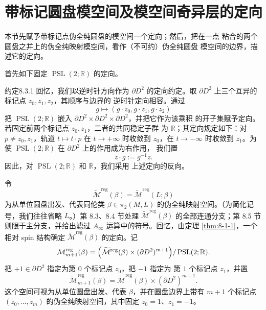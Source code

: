 
\section{带标记圆盘模空间及模空间奇异层的定向}
\label{sec:8-3}

本节先赋予带标记点伪全纯圆盘的模空间一个定向；然后，把在一点
粘合的两个圆盘之并上的伪全纯映射模空间，看作（不可约）伪全纯圆盘
模空间的边界，描述它的定向。

首先如下固定 $\operatorname{PSL}(2;\mathbb R)$ 的定向。

\begin{statement}{约定}{8.3.1}\label{conv:8-3-1}
回忆，我们以逆时针方向作为 $\partial D^2$ 的定向约定。取
$\partial D^2$ 上三个互异的标记点 $z_0,z_1,z_2$，其顺序与边界的
逆时针定向相容。通过
\[
 g\longmapsto(g\cdot z_0,g\cdot z_1,g\cdot z_2)
\]
把 $\operatorname{PSL}(2;\mathbb R)$ 嵌入
$\partial D^2\times\partial D^2\times\partial D^2$，并把它作为该乘积
的开子集赋予定向。若固定前两个标记点 $z_0,z_1$，二者的共同稳定子群
为 $\mathbb R$；其定向规定如下：对 $p\ne z_0,z_1$，轨道
$t\mapsto t\cdot p$ 在 $t\to+\infty$ 时收敛到 $z_0$，在
$t\to-\infty$ 时收敛到 $z_1$。为使
$\operatorname{PSL}(2;\mathbb R)$ 在 $\partial D^2$ 上的作用成为右作用，
我们置
\[
 z\cdot g:=g^{-1}z.
\]
因此，对 $\operatorname{PSL}(2;\mathbb R)$ 和 $\mathbb R$，我们采用
上述定向的反向。
\end{statement}

令
\[
 \widetilde{\mathcal M}^{\mathrm{reg}}(\beta)
 =\widetilde{\mathcal M}^{\mathrm{reg}}(L;\beta)
\]
为从单位圆盘出发、代表同伦类
$\beta\in\pi_2(M,L)$ 的伪全纯映射空间。（为简化记号，我们往往省略
$L$。）第 8.3、8.4 节处理
$\widetilde{\mathcal M}^{\mathrm{reg}}(\beta)$ 的全部连通分支；第 8.5 节
则限于主分支，并给出滤过 $A_\infty$ 运算中的符号。回忆，由定理
\ref{thm:8-1-1}，一个相对 spin 结构确定
$\widetilde{\mathcal M}^{\mathrm{reg}}(\beta)$ 的定向。记
\[
 \mathcal M_{m+1}^{\mathrm{reg}}(\beta)
 =\Bigl(\widetilde{\mathcal M}^{\mathrm{reg}}(\beta)
 \times(\partial D^2)^{m+1}\Bigr)
 /\operatorname{PSL}(2;\mathbb R).
\]
把 $+1\in\partial D^2$ 指定为第 $0$ 个标记点 $z_0$，把 $-1$ 指定为
第 $1$ 个标记点 $z_1$，并置%
\[
 \widetilde{\mathcal M}_{m+1}^{\mathrm{reg}}(\beta)
 =\widetilde{\mathcal M}^{\mathrm{reg}}(\beta)
  \times(\partial D^2)^{m-1}.
\]
这个空间可视为从单位圆盘出发、代表 $\beta$，并在圆盘边界上带有
$m+1$ 个标记点 $(z_0,\ldots,z_m)$ 的伪全纯映射空间，其中固定
$z_0=1$、$z_1=-1$。

